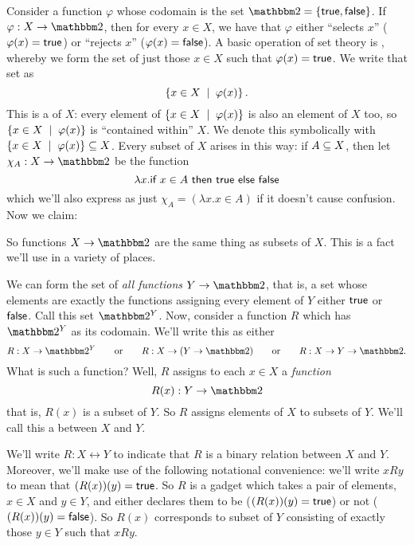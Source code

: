     Consider a function $\varphi$ whose codomain is the set $\Bool=\set{\True,\False}$. If $\varphi:X\to\Bool$, then for every $x\in X$, we have that $\varphi$ either ``selects $x$'' ($\varphi(x)=\textsf{true}$) or ``rejects $x$'' ($\varphi(x)=\textsf{false}$). A basic operation of set theory is , whereby we form the set of just those $x\in X$ such that $\varphi(x)=\textsf{true}$. We write that set as
        \[ \left\{ x\in X\;\mid\; \varphi(x)\right\}. \]
    This is a  of $X$: every element of $\left\{ x\in X\;\mid\; \varphi(x)\right\}$ is also an element of $X$ too, so $\left\{ x\in X\;\mid\; \varphi(x)\right\}$ is ``contained within'' $X$. We denote this symbolically with $\left\{ x\in X\;\mid\; \varphi(x)\right\}\subseteq X$. Every subset of $X$ arises in this way: if $A\subseteq X$, then let $\chi_A:X\to\Bool$ be the function
        \[ \lambda x.\textsf{if } x\in A \textsf{ then } \textsf{true} \textsf{ else } \textsf{false} \]
    which we'll also express as just $\chi_A = (\lambda x.x\in A)$ if it doesn't cause confusion. Now we claim:

    So functions $X\to\Bool$ are the same thing as subsets of $X$. This is a fact we'll use in a variety of places.

    We can form the set of \textit{all functions} $Y\to\Bool$, that is, a set whose elements are exactly the functions assigning every element of $Y$ either $\textsf{true}$ or $\textsf{false}$. Call this set $\Bool^Y$. Now, consider a function $R$ which has $\Bool^Y$ as its codomain. We'll write this as either
        \[ R:X\to\Bool^Y \qtq{or} R:X\to(Y\to\Bool) \qtq{or} R:X\to Y\to\Bool. \]
    What is such a function? Well, $R$ assigns to each $x\in X$ a \textit{function}
        \[ R(x) : Y \to \Bool \]
    that is, $R(x)$ is a subset of $Y$. So $R$ assigns elements of $X$ to subsets of $Y$. We'll call this a  between $X$ and $Y$.

    We'll write $R:X\rel Y$ to indicate that $R$ is a binary relation between $X$ and $Y$. Moreover, we'll make use of the following notational convenience: we'll write $xRy$ to mean that $(R(x))(y)=\textsf{true}$. So $R$ is a gadget which takes a pair of elements, $x\in X$ and $y\in Y$, and either declares them to be  ($(R(x))(y)=\textsf{true}$) or not ($(R(x))(y)=\textsf{false}$). So $R(x)$ corresponds to subset of $Y$ consisting of exactly those $y\in Y$ such that $xRy$.

    

